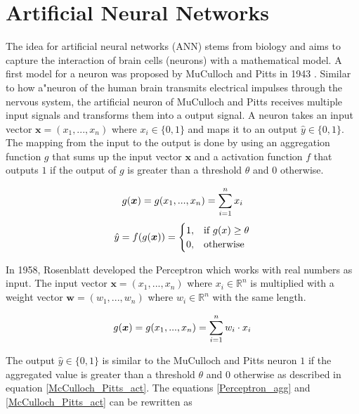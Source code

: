 \section{Artificial Neural Networks}
The idea for artificial neural networks (ANN) stems from biology and aims to capture the interaction of brain cells (neurons) with a mathematical model.
A first model for a neuron was proposed by MuCulloch and Pitts in 1943 .
Similar to how a"neuron of the human brain transmits electrical impulses through the nervous system, the artificial neuron of MuCulloch and Pitts receives multiple input signals and transforms them into a output signal.
A neuron takes an input vector \(\boldsymbol{x} = (x_1, ..., x_n)\) where \(x_i \in \{0, 1\}\) and maps it to an output \(\hat{y} \in \{0, 1\}\).
The mapping from the input to the output is done by using an aggregation function \(g\) that sums up the input vector \(\boldsymbol{x}\) and a activation function \(f\) that outputs \(1\) if the output of \(g\) is greater than a threshold \(\theta\) and \(0\) otherwise.

\begin{equation}\eqlbl{McCulloch_Pitts_agg}
	g(\boldsymbol{x}) = g(x_1, ..., x_n) = \sum_{i=1}^{n}x_i\\
\end{equation}
\begin{equation}\eqlbl{McCulloch_Pitts_act}
		\hat{y} = f(g(\boldsymbol{x})) = \begin{cases}
      		1, & \text{if}\ g(x) \geq \theta \\
      		0, & \text{otherwise}
    	\end{cases}
\end{equation}%

In 1958, Rosenblatt  developed the Perceptron which works with real numbers as input.
The input vector \(\boldsymbol{x} = (x_1, ..., x_n)\) where \(x_i \in \mathbb{R}^n\) is multiplied with a weight vector \(\boldsymbol{w} = (w_1, ..., w_n)\) where \(w_i \in \mathbb{R}^n\) with the same length.

\begin{equation}\eqlbl{Perceptron_agg}
	g(\boldsymbol{x}) = g(x_1, ..., x_n) = \sum_{i=1}^{n} w_i \cdot x_i\\
\end{equation}

The output \(\hat{y} \in \{0, 1\}\) is similar to the MuCulloch and Pitts neuron \(1\) if the aggregated value is greater than a threshold \(\theta\) and \(0\) otherwise as described in equation \ref{McCulloch_Pitts_act}. The equations \eqref*{Perceptron_agg} and \eqref*{McCulloch_Pitts_act} can be rewritten as


